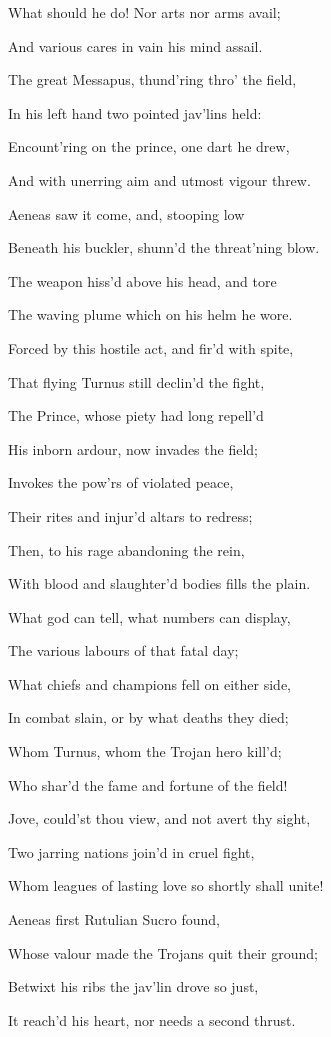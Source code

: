What should he do! Nor arts nor arms avail;

And various cares in vain his mind assail.

The great Messapus, thund’ring thro’ the field,

In his left hand two pointed jav’lins held:

Encount’ring on the prince, one dart he drew,

And with unerring aim and utmost vigour threw.

Aeneas saw it come, and, stooping low

Beneath his buckler, shunn’d the threat’ning blow.

The weapon hiss’d above his head, and tore

The waving plume which on his helm he wore.

Forced by this hostile act, and fir’d with spite,

That flying Turnus still declin’d the fight,

The Prince, whose piety had long repell’d

His inborn ardour, now invades the field;

Invokes the pow’rs of violated peace,

Their rites and injur’d altars to redress;

Then, to his rage abandoning the rein,

With blood and slaughter’d bodies fills the plain.

What god can tell, what numbers can display,

The various labours of that fatal day;

What chiefs and champions fell on either side,

In combat slain, or by what deaths they died;

Whom Turnus, whom the Trojan hero kill’d;

Who shar’d the fame and fortune of the field!

Jove, could’st thou view, and not avert thy sight,

Two jarring nations join’d in cruel fight,

Whom leagues of lasting love so shortly shall unite!

Aeneas first Rutulian Sucro found,

Whose valour made the Trojans quit their ground;

Betwixt his ribs the jav’lin drove so just,

It reach’d his heart, nor needs a second thrust.

